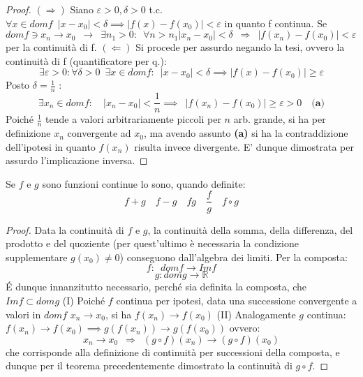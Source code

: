 \documentclass[10pt]{article}
\theoremstyle{plain}
\begin{document}
\begin{proof} $(\Rightarrow)$
Siano $\varepsilon > 0, \delta > 0$ t.c. $\forall x \in domf \enspace |x-x_0| < \delta \implies |f(x) - f(x_0)| < \varepsilon$ in quanto f continua.
Se $domf \owns x_n \rightarrow x_0 \enspace \longrightarrow \enspace \exists n_1 > 0 : \enspace \forall n > n_1 |x_n - x_0| < \delta \enspace \Longrightarrow \enspace |f(x_n) - f(x_0)| < \varepsilon$ per la continuità di f. \newline
$(\Leftarrow)$ Si procede per assurdo negando la tesi, ovvero la continuità di f (quantificatore per q.):
\[\exists \varepsilon > 0 : \forall \delta > 0 \enspace \exists x \in domf : \enspace |x - x_0| < \delta \implies |f(x) - f(x_0)| \geq \varepsilon\]
Posto $\delta = \frac{1}{n}$ :
\[\exists x_n \in domf : \enspace \enspace |x_n - x_0| < \frac{1}{n} \implies \enspace |f(x_n) - f(x_0)| \geq \varepsilon > 0 \quad {\textbf{(a)}}\]
Poiché $\frac{1}{n}$ tende a valori arbitrariamente piccoli per $n$ arb. grande, si ha per definizione $x_n$ convergente ad $x_0$, ma avendo assunto \textbf{(a)} si ha la contraddizione dell'ipotesi in quanto $f(x_n)$ risulta invece divergente.
E' dunque dimostrata per assurdo l'implicazione inversa.
\end{proof}
\begin{ther}
Se $f$ e $g$ sono funzioni continue lo sono, quando definite:
\[f+g \quad f-g \quad fg \quad \frac{f}{g} \quad f \circ g\]
\end{ther}
\begin{proof}
Data la continuità di $f$ e $g$, la continuità della somma, della differenza, del prodotto e del quoziente (per quest'ultimo è necessaria la condizione supplementare $g(x_0) \neq 0$) conseguono dall'algebra dei limiti. 
Per la composta:
\[f : \enspace dom f \longrightarrow Im f\]
\[g : dom g \longrightarrow \mathbb{R}\]
\'E dunque innanzitutto necessario, perché sia definita la composta, che $Im f \subset dom g$ \newline (I) Poiché $f$ continua per ipotesi, data una successione convergente a valori in $domf$ $x_n \longrightarrow x_0$, si ha $f(x_n) \longrightarrow f(x_0)$ \newline (II) Analogamente $g$ continua: $f(x_n) \longrightarrow f(x_0) \implies g(f(x_n)) \longrightarrow g(f(x_0))$ ovvero:
\[x_n \longrightarrow x_0 \enspace \Longrightarrow \enspace (g \circ f) (x_n) \longrightarrow (g \circ f) (x_0)\]
che corrisponde alla definizione di continuità per successioni della composta, e dunque per il teorema precedentemente dimostrato la continuità di $g \circ f$.
\end{proof}
\end{document}
